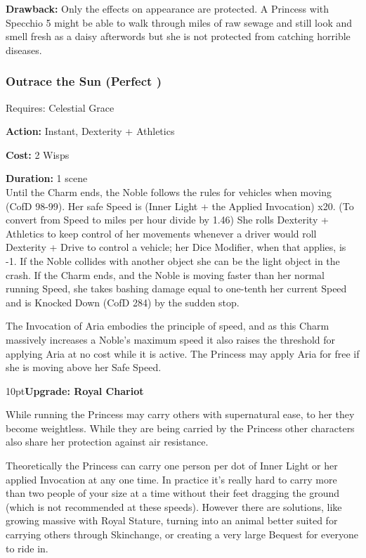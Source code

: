 \textbf{Drawback:} Only the effects on appearance are protected. A Princess with Specchio 5 might be able to walk through miles of raw sewage and still look and smell fresh as a daisy afterwords but she is not protected from catching horrible diseases.

\subsubsection*{Outrace the Sun (Perfect \textbullet\textbullet\textbullet)}

\noindent Requires: Celestial Grace

\noindent \textbf{Action:} Instant, Dexterity + Athletics

\noindent \textbf{Cost:} 2 Wisps

\noindent \textbf{Duration:} 1 scene \\

\noindent Until the Charm ends, the Noble follows the rules for vehicles when moving (CofD 98-99). Her safe Speed is (Inner Light + the Applied Invocation) x20. (To convert from Speed to miles per hour divide by 1.46)  She rolls Dexterity + Athletics to keep control of her movements whenever a driver would roll Dexterity + Drive to control a vehicle; her Dice Modifier, when that applies, is -1. If the Noble collides with another object she can be the light object in the crash. If the Charm ends, and the Noble is moving faster than her normal running Speed, she takes bashing damage equal to one-tenth her current Speed and is Knocked Down (CofD 284) by the sudden stop.

The Invocation of Aria embodies the principle of speed, and as this Charm massively increases a Noble's maximum speed it also raises the threshold for applying Aria at no cost while it is active. The Princess may apply Aria for free if she is moving above her Safe Speed. 

\begin{myindentpar}{10pt}\textbf{Upgrade: Royal Chariot}

While running the Princess may carry others with supernatural ease, to her they become weightless. While they are being carried by the Princess other characters also share her protection against air resistance.

Theoretically the Princess can carry one person per dot of Inner Light or her applied Invocation at any one time. In practice it's really hard to carry more than two people of your size at a time without their feet dragging the ground (which is not recommended at these speeds). However there are solutions, like growing massive with Royal Stature, turning into an animal better suited for carrying others through Skinchange, or creating a very large Bequest for everyone to ride in. 

\end{myindentpar}


